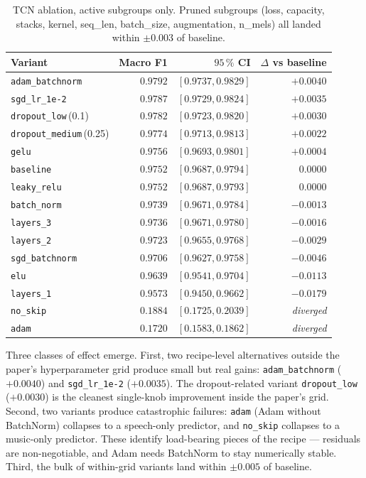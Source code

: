 \begin{table}[h]
\centering
\begin{tabular}{lrrr}
\toprule
\textbf{Variant} & \textbf{Macro F1} & \textbf{$95\,\%$ CI} & \textbf{$\Delta$ vs baseline} \\
\midrule
\texttt{adam\_batchnorm}      & $\mathbf{0.9792}$ & $[0.9737, 0.9829]$ & $+0.0040$ \\
\texttt{sgd\_lr\_1e-2}        & $\mathbf{0.9787}$ & $[0.9729, 0.9824]$ & $+0.0035$ \\
\texttt{dropout\_low}\,(0.1)  & $\mathbf{0.9782}$ & $[0.9723, 0.9820]$ & $+0.0030$ \\
\texttt{dropout\_medium}\,(0.25) & $0.9774$       & $[0.9713, 0.9813]$ & $+0.0022$ \\
\texttt{gelu}                 & $0.9756$          & $[0.9693, 0.9801]$ & $+0.0004$ \\
\texttt{baseline}             & $0.9752$          & $[0.9687, 0.9794]$ & $\phantom{+}0.0000$ \\
\texttt{leaky\_relu}          & $0.9752$          & $[0.9687, 0.9793]$ & $\phantom{-}0.0000$ \\
\texttt{batch\_norm}          & $0.9739$          & $[0.9671, 0.9784]$ & $-0.0013$ \\
\texttt{layers\_3}            & $0.9736$          & $[0.9671, 0.9780]$ & $-0.0016$ \\
\texttt{layers\_2}            & $0.9723$          & $[0.9655, 0.9768]$ & $-0.0029$ \\
\texttt{sgd\_batchnorm}       & $0.9706$          & $[0.9627, 0.9758]$ & $-0.0046$ \\
\texttt{elu}                  & $0.9639$          & $[0.9541, 0.9704]$ & $-0.0113$ \\
\texttt{layers\_1}            & $0.9573$          & $[0.9450, 0.9662]$ & $-0.0179$ \\
\texttt{no\_skip}             & $\mathit{0.1884}$ & $[0.1725, 0.2039]$ & \emph{diverged} \\
\texttt{adam}                 & $\mathit{0.1720}$ & $[0.1583, 0.1862]$ & \emph{diverged} \\
\bottomrule
\end{tabular}
\caption{TCN ablation, active subgroups only. Pruned subgroups (loss, capacity, stacks, kernel, seq\_len, batch\_size, augmentation, n\_mels) all landed within $\pm 0.003$ of baseline.}
\label{tab:ablation_results}
\end{table}

Three classes of effect emerge.
First, two recipe-level alternatives outside the paper's hyperparameter grid produce small but real gains: \texttt{adam\_batchnorm} ($+0.0040$) and \texttt{sgd\_lr\_1e-2} ($+0.0035$).
The dropout-related variant \texttt{dropout\_low} ($+0.0030$) is the cleanest single-knob improvement inside the paper's grid.
Second, two variants produce catastrophic failures: \texttt{adam} (Adam without BatchNorm) collapses to a speech-only predictor, and \texttt{no\_skip} collapses to a music-only predictor.
These identify load-bearing pieces of the recipe — residuals are non-negotiable, and Adam needs BatchNorm to stay numerically stable.
Third, the bulk of within-grid variants land within $\pm 0.005$ of baseline.

